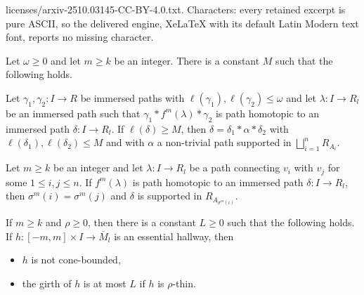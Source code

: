 \documentclass[10pt,a4paper]{amsart}
\DeclareMathOperator{\len}{\ell}
\begin{document}
licenses/arxiv-2510.03145-CC-BY-4.0.txt. Characters: every retained excerpt is pure ASCII, so the delivered engine, XeLaTeX with its default Latin Modern text font, reports no missing character.
\begin{lemma}
\label{lem:iteration_general}
Let $\omega\geqslant 0$ and let $m\geqslant k$ be an integer. There is a constant $M$ such that the following holds. 

Let $\gamma_1, \gamma_2\colon I \to R$ be immersed paths with $\len(\gamma_1), \len(\gamma_2)\leqslant \omega$ and let $\lambda\colon I\to R_{l}$ be an immersed path such that $\gamma_1*f^m(\lambda)*\gamma_2$ is path homotopic to an immersed path $\delta\colon I\to R_{l}$. If $\len(\delta)\geqslant M$, then $\delta = \delta_1*\alpha*\delta_2$ with $\len(\delta_1), \len(\delta_2)\leqslant M$ and with $\alpha$ a non-trivial path supported in $\bigsqcup_{i=1}^nR_{A_i}$.
\end{lemma}

\begin{lemma}
\label{lem:iteration}
Let $m\geqslant k$ be an integer and let $\lambda\colon I\to R_l$ be a path connecting $v_i$ with $v_j$ for some $1\leqslant i, j\leqslant n$. If $f^m(\lambda)$ is path homotopic to an immersed path $\delta\colon I \to R_l$, then $\sigma^m(i) = \sigma^m(j)$ and $\delta$ is supported in $R_{A_{\sigma^m(i)}}$. 
\end{lemma}

\begin{proposition}
\label{prop:hallways}
If $m\geqslant k$ and $\rho\geqslant 0$, then there is a constant $L\geqslant 0$ such that the following holds. If $h\colon [-m, m]\times I\to \overline{M}_{l}$ is an essential hallway, then
\begin{itemize}
\item $h$ is not cone-bounded,
\item the girth of $h$ is at most $L$ if $h$ is $\rho$-thin.
\end{itemize}
\end{proposition}
\end{document}
